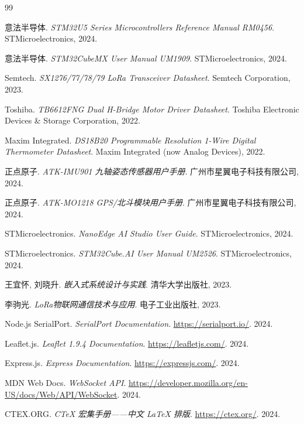 \documentclass[12pt,a4paper]{ctexart}
\begin{document}
\begin{thebibliography}{99}

意法半导体. \textit{STM32U5 Series Microcontrollers Reference Manual RM0456}. STMicroelectronics, 2024.

意法半导体. \textit{STM32CubeMX User Manual UM1909}. STMicroelectronics, 2024.

Semtech. \textit{SX1276/77/78/79 LoRa Transceiver Datasheet}. Semtech Corporation, 2023.

Toshiba. \textit{TB6612FNG Dual H-Bridge Motor Driver Datasheet}. Toshiba Electronic Devices \& Storage Corporation, 2022.

Maxim Integrated. \textit{DS18B20 Programmable Resolution 1-Wire Digital Thermometer Datasheet}. Maxim Integrated (now Analog Devices), 2022.

正点原子. \textit{ATK-IMU901 九轴姿态传感器用户手册}. 广州市星翼电子科技有限公司, 2024.

正点原子. \textit{ATK-MO1218 GPS/北斗模块用户手册}. 广州市星翼电子科技有限公司, 2024.

STMicroelectronics. \textit{NanoEdge AI Studio User Guide}. STMicroelectronics, 2024.

STMicroelectronics. \textit{STM32Cube.AI User Manual UM2526}. STMicroelectronics, 2024.

王宜怀, 刘晓升. \textit{嵌入式系统设计与实践}. 清华大学出版社, 2023.

李驹光. \textit{LoRa物联网通信技术与应用}. 电子工业出版社, 2023.

Node.js SerialPort. \textit{SerialPort Documentation}. \url{https://serialport.io/}. 2024.

Leaflet.js. \textit{Leaflet 1.9.4 Documentation}. \url{https://leafletjs.com/}. 2024.

Express.js. \textit{Express Documentation}. \url{https://expressjs.com/}. 2024.

MDN Web Docs. \textit{WebSocket API}. \url{https://developer.mozilla.org/en-US/docs/Web/API/WebSocket}. 2024.

CTEX.ORG. \textit{CTeX 宏集手册——中文 \LaTeX{} 排版}. \url{https://ctex.org/}. 2024.

\end{thebibliography}
\end{document}

